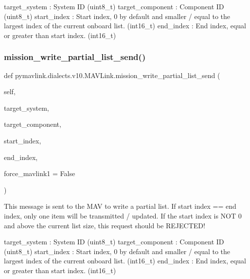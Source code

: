 \begin{DoxyVerb}
\begin{DoxyVerb}
\begin{DoxyVerb}
\begin{DoxyVerb}
\begin{DoxyVerb}
target_system             : System ID (uint8_t)
target_component          : Component ID (uint8_t)
start_index               : Start index, 0 by default and smaller / equal to the largest index of the current onboard list. (int16_t)
end_index                 : End index, equal or greater than start index. (int16_t)\end{DoxyVerb}
 \mbox{\label{classpymavlink_1_1dialects_1_1v10_1_1MAVLink_a88807abea0324b85bdb0ebab662b068b}} 
\subsubsection{\texorpdfstring{mission\+\_\+write\+\_\+partial\+\_\+list\+\_\+send()}{mission\_write\_partial\_list\_send()}}
{\footnotesize\ttfamily def pymavlink.\+dialects.\+v10.\+M\+A\+V\+Link.\+mission\+\_\+write\+\_\+partial\+\_\+list\+\_\+send (\begin{DoxyParamCaption}\item[{}]{self,  }\item[{}]{target\+\_\+system,  }\item[{}]{target\+\_\+component,  }\item[{}]{start\+\_\+index,  }\item[{}]{end\+\_\+index,  }\item[{}]{force\+\_\+mavlink1 = {\ttfamily False} }\end{DoxyParamCaption})}

\begin{DoxyVerb}This message is sent to the MAV to write a partial list. If start
index == end index, only one item will be transmitted
/ updated. If the start index is NOT 0 and above the
current list size, this request should be REJECTED!

target_system             : System ID (uint8_t)
target_component          : Component ID (uint8_t)
start_index               : Start index, 0 by default and smaller / equal to the largest index of the current onboard list. (int16_t)
end_index                 : End index, equal or greater than start index. (int16_t)\end{DoxyVerb}
 \mbox{\label{classpymavlink_1_1dialects_1_1v10_1_1MAVLink_a787ff5ef85366843e4af2c6ddb9c017c}} 

\end{DoxyVerb}
\end{DoxyVerb}
\end{DoxyVerb}
\end{DoxyVerb}
